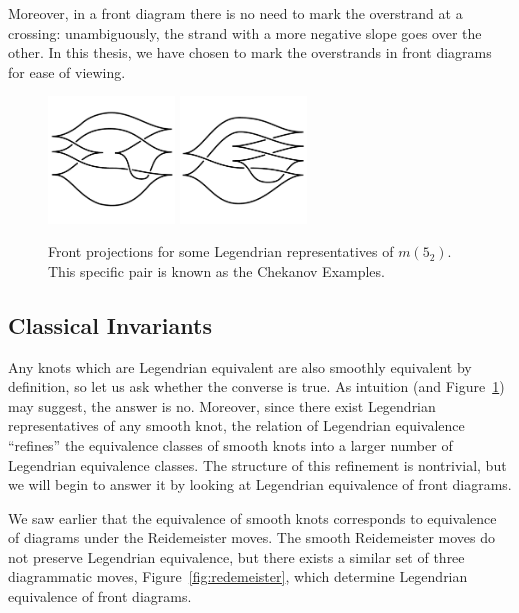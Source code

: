 Moreover, in a front diagram there is no need to mark the overstrand at a crossing: unambiguously, the strand with a more negative slope goes over the other. In this thesis, we have chosen to mark the overstrands in front diagrams for ease of viewing.

\begin{figure}[ht]
    \centering
    \includegraphics[width=0.3\textwidth]{images/chekanov-1.pdf}
    \hspace{2em}
    \includegraphics[width=0.3\textwidth]{images/chekanov-2.pdf}
    \caption{Front projections for some Legendrian representatives of $m(5_2)$. This specific pair is known as the Chekanov Examples.}%
    \label{fig:front-projection}
\end{figure}

\subsection{Classical Invariants}\label{subsec:invariants}

Any knots which are Legendrian equivalent are also smoothly equivalent by definition, so let us ask whether the converse is true.
As intuition (and Figure~\ref{fig:front-projection}) may suggest, the answer is no. Moreover, since there exist Legendrian representatives of any smooth knot, the relation of Legendrian equivalence ``refines'' the equivalence classes of smooth knots into a larger number of Legendrian equivalence classes.
The structure of this refinement is nontrivial, but we will begin to answer it by looking at Legendrian equivalence of front diagrams.

We saw earlier that the equivalence of smooth knots corresponds to equivalence of diagrams under the Reidemeister moves. The smooth Reidemeister moves do not preserve Legendrian equivalence, but there exists a similar set of three diagrammatic moves, Figure~\ref{fig:redemeister}, which determine Legendrian equivalence of front diagrams.

